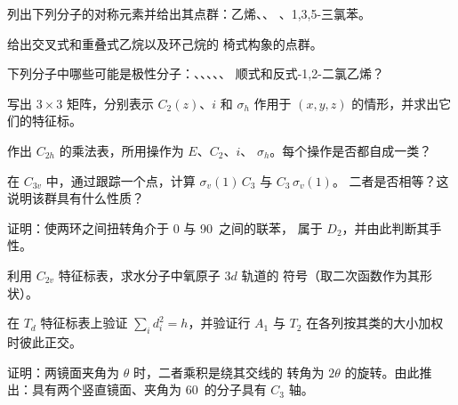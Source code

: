 \begin{exercise}[$\star$]\label{exo:b3:point-groups:1}
列出下列分子的对称元素并给出其点群：乙烯、、
、1,3,5-三氯苯。
\end{exercise}

\begin{exercise}[$\star$]\label{exo:b3:point-groups:2}
给出交叉式和重叠式乙烷以及环己烷的
椅式构象的点群。
\end{exercise}

\begin{exercise}[$\star$]\label{exo:b3:point-groups:3}
下列分子中哪些可能是极性分子：、、、、、
顺式和反式-1,2-二氯乙烯？
\end{exercise}

\begin{exercise}[$\star$]\label{exo:b3:point-groups:4}
写出 $3\times3$ 矩阵，分别表示 $C_2(z)$、$i$ 和 $\sigma_h$
作用于 $(x, y, z)$ 的情形，并求出它们的特征标。
\end{exercise}

\begin{exercise}[$\star\star$]\label{exo:b3:point-groups:5}
作出 $C_{2h}$ 的乘法表，所用操作为 $E$、$C_2$、$i$、
$\sigma_h$。每个操作是否都自成一类？
\end{exercise}

\begin{exercise}[$\star\star$]\label{exo:b3:point-groups:6}
在 $C_{3v}$ 中，通过跟踪一个点，计算 $\sigma_v(1)\,C_3$ 与 $C_3\,\sigma_v(1)$。
二者是否相等？这说明该群具有什么性质？
\end{exercise}

\begin{exercise}[$\star\star$]\label{exo:b3:point-groups:7}
证明：使两环之间扭转角介于 0 与 90\textdegree\ 之间的联苯，
属于 $D_2$，并由此判断其手性。
\end{exercise}

\begin{exercise}[$\star\star$]\label{exo:b3:point-groups:8}
利用 $C_{2v}$ 特征标表，求水分子中氧原子 $3d$ 轨道的
符号（取二次函数作为其形状）。
\end{exercise}

\begin{exercise}[$\star\star$]\label{exo:b3:point-groups:9}
在 $T_d$ 特征标表上验证 $\sum_id_i^2 = h$，并验证行 $A_1$ 与 $T_2$
在各列按其类的大小加权时彼此正交。
\end{exercise}

\begin{exercise}[$\star\star\star$]\label{exo:b3:point-groups:10}
证明：两镜面夹角为 $\theta$ 时，二者乘积是绕其交线的
转角为 $2\theta$ 的旋转。由此推出：具有两个竖直镜面、夹角为
60\textdegree\ 的分子具有 $C_3$ 轴。
\end{exercise}

